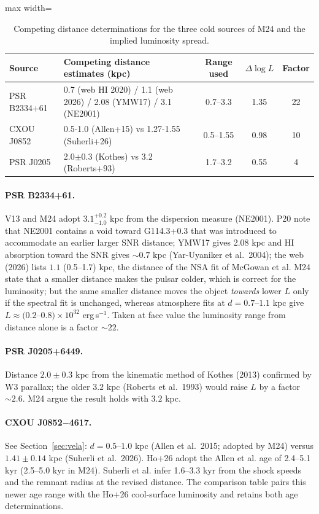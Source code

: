 \documentclass[11pt,a4paper]{article}
\begin{document}
\begin{table}[htbp]
\centering\small
\caption{Competing distance determinations for the three cold sources of M24 and the implied luminosity spread.}\label{tab:comp}
\begin{adjustbox}{max width=\textwidth}\begin{tabular}{llccc}
\toprule
Source & Competing distance estimates (kpc) & Range used & $\Delta\log L$ & Factor\\
\midrule
PSR B2334+61 & 0.7 (web HI 2020) / 1.1 (web 2026) / 2.08 (YMW17) / 3.1 (NE2001) & 0.7--3.3 & 1.35 & 22\\
CXOU J0852 & 0.5-1.0 (Allen+15) vs 1.27-1.55 (Suherli+26) & 0.5--1.55 & 0.98 & 10\\
PSR J0205 & 2.0$\pm$0.3 (Kothes) vs 3.2 (Roberts+93) & 1.7--3.2 & 0.55 & 4\\
\bottomrule
\end{tabular}\end{adjustbox}
\end{table}


\paragraph{PSR B2334+61.} V13 and M24 adopt $3.1^{+0.2}_{-1.0}$ kpc from the dispersion measure (NE2001). P20 note that NE2001 contains a void toward G114.3+0.3 that was introduced to accommodate an earlier larger SNR distance; YMW17 gives 2.08 kpc and HI absorption toward the SNR gives $\sim0.7$ kpc (Yar-Uyaniker et al.\ 2004); the web (2026) lists $1.1$ (0.5--1.7) kpc, the distance of the NSA fit of McGowan et al. M24 state that a smaller distance makes the pulsar colder, which is correct for the luminosity; but the same smaller distance moves the object \emph{towards} lower $L$ only if the spectral fit is unchanged, whereas atmosphere fits at $d=0.7$--$1.1$ kpc give $L\approx(0.2$--$0.8)\times10^{32}$ erg\,s$^{-1}$. Taken at face value the luminosity range from distance alone is a factor $\sim22$.

\paragraph{PSR J0205+6449.} Distance $2.0\pm0.3$ kpc from the kinematic method of Kothes (2013) confirmed by W3 parallax; the older $3.2$ kpc (Roberts et al.\ 1993) would raise $L$ by a factor $\sim2.6$. M24 argue the result holds with $3.2$ kpc.

\paragraph{CXOU J0852$-$4617.} See Section~\ref{sec:vela}: $d=0.5$--$1.0$ kpc (Allen et al.\ 2015; adopted by M24) versus $1.41\pm0.14$ kpc (Suherli et al.\ 2026). Ho+26 adopt the Allen et al. age of 2.4--5.1 kyr (2.5--5.0 kyr in M24). Suherli et al. infer 1.6--3.3 kyr from the shock speeds and the remnant radius at the revised distance. The comparison table pairs this newer age range with the Ho+26 cool-surface luminosity and retains both age determinations.
\end{document}
